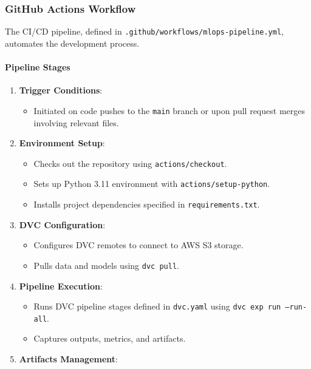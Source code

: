 \documentclass{article}
\begin{document}
\subsubsection{GitHub Actions Workflow}

The CI/CD pipeline, defined in \texttt{.github/workflows/mlops-pipeline.yml}, automates the development process.

\paragraph{Pipeline Stages}

\begin{enumerate}[leftmargin=*]
    \item \textbf{Trigger Conditions}:
        \begin{itemize}[leftmargin=*]
            \item Initiated on code pushes to the \texttt{main} branch or upon pull request merges involving relevant files.
        \end{itemize}
    \item \textbf{Environment Setup}:
        \begin{itemize}[leftmargin=*]
            \item Checks out the repository using \texttt{actions/checkout}.
            \item Sets up Python 3.11 environment with \texttt{actions/setup-python}.
            \item Installs project dependencies specified in \texttt{requirements.txt}.
        \end{itemize}
    \item \textbf{DVC Configuration}:
        \begin{itemize}[leftmargin=*]
            \item Configures DVC remotes to connect to AWS S3 storage.
            \item Pulls data and models using \texttt{dvc pull}.
        \end{itemize}
    \item \textbf{Pipeline Execution}:
        \begin{itemize}[leftmargin=*]
            \item Runs DVC pipeline stages defined in \texttt{dvc.yaml} using \texttt{dvc exp run --run-all}.
            \item Captures outputs, metrics, and artifacts.
        \end{itemize}
    \item \textbf{Artifacts Management}:

\end{enumerate}
\end{document}
